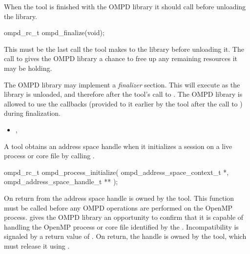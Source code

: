 \label{ompd:ompd_finalize}

\summary
When the tool is finished with the OMPD library it should call  before 
unloading the library.

\format

\begin{cspecific}
\begin{ompSyntax}
ompd_rc_t ompd_finalize(void);
\end{ompSyntax}
\end{cspecific}


\descr
This must be the last call the tool makes to the library before
unloading it. The call to  gives the OMPD library a chance to
free up any remaining resources it may be holding.

The OMPD library may implement a \emph{finalizer} section. This will execute as the library is 
unloaded, and therefore after the tool's call to . The OMPD library is allowed 
to use the callbacks (provided to it earlier by the tool after the call to 
) during finalization.

\crossreferences
\begin{itemize}
	\item
	, 
\end{itemize}


\label{ompd:ompd_process_initialize}
\summary
A tool obtains an address space handle when it initializes
a session on a live process or core file by calling .

\format

\begin{cspecific}
\begin{ompSyntax}
ompd_rc_t ompd_process_initialize(
  ompd_address_space_context_t *,
  ompd_address_space_handle_t **
);
\end{ompSyntax}
\end{cspecific}


\descr
On return from  the address
space handle is owned by the tool. This function must be called before any OMPD operations 
are performed on the OpenMP process.  gives the OMPD library an 
opportunity to confirm that it is capable of handling the OpenMP process or core file identified by 
the . Incompatibility is signaled by a return value of . 
On return, the handle is owned by the tool, which must release it using 
.

